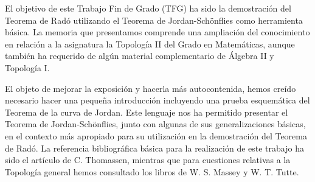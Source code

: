 El objetivo  de este Trabajo Fin de Grado (TFG) ha sido la demostración del Teorema de Radó   utilizando el Teorema de Jordan-Schönflies como herramienta básica. La memoria que presentamos comprende una ampliación del conocimiento en relación a la asignatura la Topología II del Grado en Matemáticas,   aunque también ha requerido  de algún material complementario de  Álgebra II y Topología I.  

El objeto de mejorar la exposición y hacerla más autocontenida, hemos creído necesario hacer una pequeña introducción incluyendo  una prueba esquemática   del Teorema de la curva de Jordan. Este lenguaje nos ha permitido  presentar el Teorema de Jordan-Schönflies, junto con algunas de sus generalizaciones básicas, en el contexto más apropiado para su utilización   en la demostración del Teorema de Radó. La referencia bibliográfica básica para la realización de este trabajo ha sido el artículo de C. Thomassen, \cite{Thomassen}  mientras que para cuestiones relativas a la Topología general hemos consultado los libros de W. S. Massey \cite{Massey} y W. T. Tutte. \cite{Tutte}
